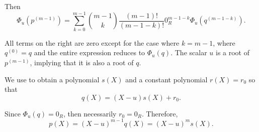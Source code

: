 \begin{defproof}
  Then
  \begin{equation*}
    \Phi_u(p^{(m-1)}) = \sum_{k=0}^{m-1} \binom {m-1} k \frac {(m - 1)!} {(m - 1 - k)!} 0_R^{m - 1 - k} \Phi_u(q^{(m - 1 - k)}).
  \end{equation*}

  All terms on the right are zero except for the case where \( k = m - 1 \), where \( q^{(0)} = q \) and the entire expression reduces to \( \Phi_u(q) \). The scalar \( u \) is a root of \( p^{(m-1)} \), implying that it is also a root of \( q \).

  We use  to obtain a polynomial \( s(X) \) and a constant polynomial \( r(X) = r_0 \) so that
  \begin{equation*}
    q(X) = (X - u) s(X) + r_0.
  \end{equation*}

  Since \( \Phi_u(q) = 0_R \), then necessarily \( r_0 = 0_R \). Therefore,
  \begin{equation*}
    p(X) = (X - u)^{m-1} q(X) = (X - u)^m s(X).
  \end{equation*}
\end{defproof}
